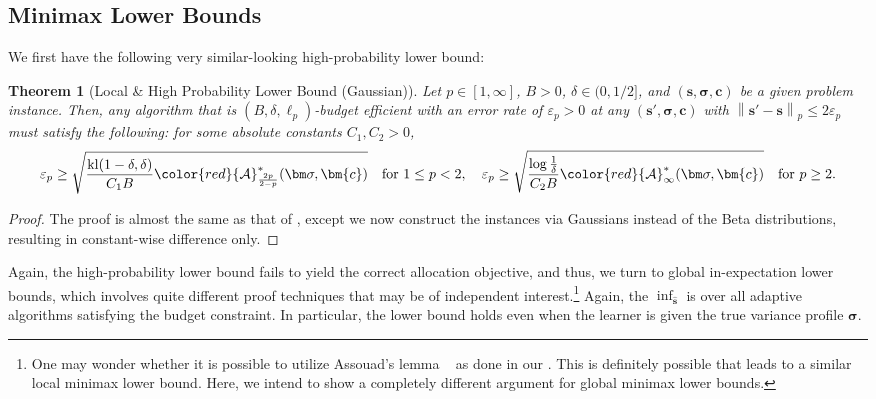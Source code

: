 \documentclass{article}
\def\vc{{\bm{c}}}
\def\vs{{\bm{s}}}
\def\gA{{\mathcal{A}}}
\newcommand{\kl}{\mathrm{kl}}
\theoremstyle{plain}
\newtheorem{theorem}{Theorem}[section]
\theoremstyle{definition}
\theoremstyle{plain}
\newcommand{\bignorm}[1]{\left\lVert #1 \right\rVert}
\begin{document}
\subsection{Minimax Lower Bounds}
We first have the following very similar-looking high-probability lower bound:
\begin{theorem}[Local \& High Probability Lower Bound (Gaussian)]
\label{thm:lower-bound-whp-gaussian}
    Let $p \in [1, \infty]$, $B > 0$, $\delta \in (0, 1/2]$, and $(\vs, \bm\sigma, \vc)$ be a given problem instance.
    Then, any algorithm that is $(B, \delta, \ell_p)$-budget efficient with an error rate of $\varepsilon_p > 0$ at any $(\vs', \bm\sigma, \vc)$ with $\bignorm{\vs' - \vs}_p \leq 2\varepsilon_p$ must satisfy the following: for some absolute constants $C_1, C_2 > 0$,
    \begin{equation}
        \varepsilon_p \geq \sqrt{\frac{\kl(1 - \delta, \delta)}{C_1 B} {\color{red}\gA_{\frac{2p}{2-p}}^*(\bm\sigma, \vc)}} \ \ \ \text{for $1 \leq p < 2$}, \quad 
        \varepsilon_p \geq \sqrt{\frac{ \log\frac{1}{\delta}}{C_2 B} {\color{red}\gA^*_{\infty}(\bm\sigma, \vc)}} \ \ \ \text{for $p \geq 2$}.
    \end{equation}
\end{theorem}
\begin{proof}
    The proof is almost the same as that of , except we now construct the instances via Gaussians instead of the Beta distributions, resulting in constant-wise difference only.
\end{proof}

Again, the high-probability lower bound fails to yield the correct allocation objective, and thus, we turn to global in-expectation lower bounds, which involves quite different proof techniques that may be of independent interest.\footnote{One may wonder whether it is possible to utilize Assouad's lemma ~\citep{assouad1983,yu1997lecam} as done in our . This is definitely possible that leads to a similar local minimax lower bound. Here, we intend to show a completely different argument for global minimax lower bounds.}
Again, the $\inf_{\hat{\vs}}$ is over all adaptive algorithms satisfying the budget constraint. In particular, the lower bound holds even when the learner is given the true variance profile \(\bm\sigma\).
\end{document}
